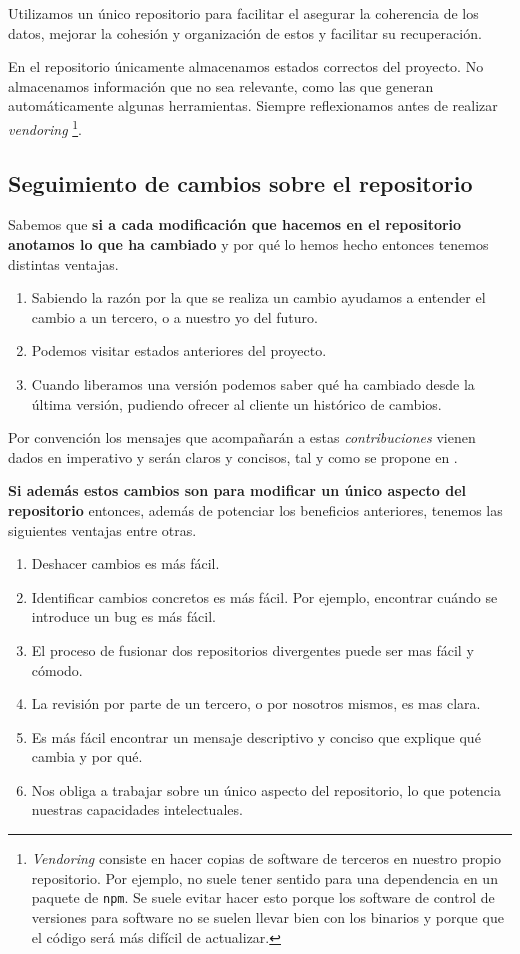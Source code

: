 Utilizamos un único repositorio para facilitar el asegurar la coherencia
de los datos, mejorar la cohesión y organización de estos y facilitar su
recuperación.

En el repositorio únicamente almacenamos estados correctos del proyecto. No
almacenamos información que no sea relevante, como las que generan automáticamente
algunas herramientas. Siempre reflexionamos antes de realizar \textit{vendoring}%
\footnote{\textit{Vendoring} consiste en hacer copias de software de terceros en
nuestro propio repositorio. Por ejemplo, no suele tener sentido para una dependencia en
un paquete de \texttt{npm}. Se suele evitar hacer esto porque los software de control
de versiones para software no se suelen llevar bien con los binarios y porque que el código será
más difícil de actualizar.}.

\subsection{Seguimiento de cambios sobre el repositorio}

Sabemos que \textbf{si a cada modificación que hacemos en el repositorio anotamos
lo que ha cambiado} y por qué lo hemos hecho entonces tenemos distintas ventajas.

\begin{enumerate}
    \item Sabiendo la razón por la que se realiza un cambio ayudamos a entender
          el cambio a un tercero, o a nuestro yo del futuro.
    \item Podemos visitar estados anteriores del proyecto.
    \item Cuando liberamos una versión podemos saber qué ha cambiado desde la última
          versión, pudiendo ofrecer al cliente un histórico de cambios.
\end{enumerate}

Por convención los mensajes que acompañarán a estas \textit{contribuciones} vienen
dados en imperativo y serán claros y concisos, tal y como se propone en \cite[Commit Guidelines]{ProGIT}.

\textbf{Si además estos cambios son para modificar un único aspecto del repositorio}
entonces, además de potenciar los beneficios anteriores, tenemos las siguientes
ventajas entre otras.

\begin{enumerate}
    \item Deshacer cambios es más fácil.
    \item Identificar cambios concretos es más fácil. Por ejemplo, encontrar cuándo se introduce un bug
           es más fácil.
    \item El proceso de fusionar dos repositorios divergentes puede ser mas fácil y cómodo.
    \item La revisión por parte de un tercero, o por nosotros mismos, es mas clara.
    \item Es más fácil encontrar un mensaje descriptivo y conciso que explique qué cambia y por qué.
    \item Nos obliga a trabajar sobre un único aspecto del repositorio, lo que potencia nuestras
          capacidades intelectuales.
\end{enumerate}

